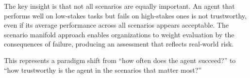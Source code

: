 \documentclass[11pt]{article}
\begin{document}
The key insight is that not all scenarios are equally important. An agent that performs well on low-stakes tasks but fails on high-stakes ones is not trustworthy, even if its average performance across all scenarios appears acceptable. The scenario manifold approach enables organizations to weight evaluation by the consequences of failure, producing an assessment that reflects real-world risk.

This represents a paradigm shift from ``how often does the agent succeed?'' to ``how trustworthy is the agent in the scenarios that matter most?''












\end{document}
